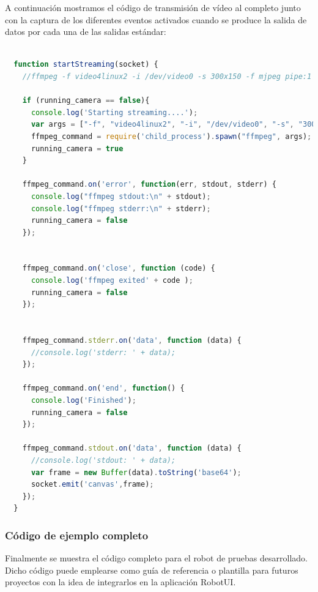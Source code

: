A continuación mostramos el código de transmisión de vídeo al completo junto con la captura de los diferentes eventos activados cuando se produce la salida de datos por cada una de las salidas estándar:\\

\begin{lstlisting}[language=JavaScript]

  function startStreaming(socket) {
    //ffmpeg -f video4linux2 -i /dev/video0 -s 300x150 -f mjpeg pipe:1 -b:v 28k -bufsize 28k

    if (running_camera == false){
      console.log('Starting streaming....');
      var args = ["-f", "video4linux2", "-i", "/dev/video0", "-s", "300x150","-f","mjpeg", "pipe:1", "-b:v 28k", "-bufsize 28k"]
      ffmpeg_command = require('child_process').spawn("ffmpeg", args);
      running_camera = true
    }

    ffmpeg_command.on('error', function(err, stdout, stderr) {
      console.log("ffmpeg stdout:\n" + stdout);
      console.log("ffmpeg stderr:\n" + stderr);
      running_camera = false
    });


    ffmpeg_command.on('close', function (code) {
      console.log('ffmpeg exited' + code );
      running_camera = false
    });


    ffmpeg_command.stderr.on('data', function (data) {
      //console.log('stderr: ' + data);
    });

    ffmpeg_command.on('end', function() {
      console.log('Finished');
      running_camera = false
    });

    ffmpeg_command.stdout.on('data', function (data) {
      //console.log('stdout: ' + data);
      var frame = new Buffer(data).toString('base64');
      socket.emit('canvas',frame);
    });
  }

\end{lstlisting}


\subsubsection{Código de ejemplo completo}

Finalmente se muestra el código completo para el robot de pruebas desarrollado. Dicho código puede emplearse como guía de referencia o plantilla para futuros proyectos con la idea de integrarlos en la aplicación RobotUI.\\


